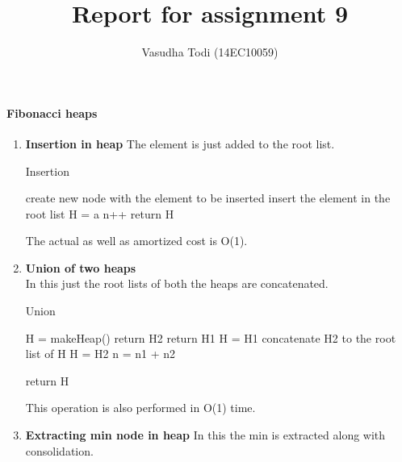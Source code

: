 \documentclass[a4paper,11pt]{article}
\title{Report for assignment 9}
\author{Vasudha Todi (14EC10059)}
\begin{document}
\maketitle

\paragraph{Fibonacci heaps}
\begin{enumerate}
 \item \textbf{Insertion in heap}
The element is just added to the root list.\\
  \begin{algorithm}
    \caption{Insertion}
    \begin{algorithmic}[1]
    \State create new node with the element to be inserted
    \State insert the element in the root list
        \State H = a
    \EndIf
    \State n++
    \State return H
    \end{algorithmic}
  \end{algorithm}
The actual as well as amortized cost is O(1).

\item \textbf{Union of two heaps}\\
In this just the root lists of both the heaps are concatenated.
  \begin{algorithm}
    \caption{Union}
    \begin{algorithmic}[1]
    \State H = makeHeap()
        \State return H2
    \EndIf 
        \State return H1
    \EndIf
    \State H = H1
    \State concatenate H2 to the root list of H
        \State H = H2
    \EndIf
    \State n = n1 + n2
\end{algorithmic}
\end{algorithm}

\begin{algorithm}                     
\begin{algorithmic} [1]
    \State return H
    \end{algorithmic}
  \end{algorithm}

This operation is also performed in O(1) time.

 \item \textbf{Extracting min node in heap}
In this the min is extracted along with consolidation.


\end{enumerate}
\end{document}
